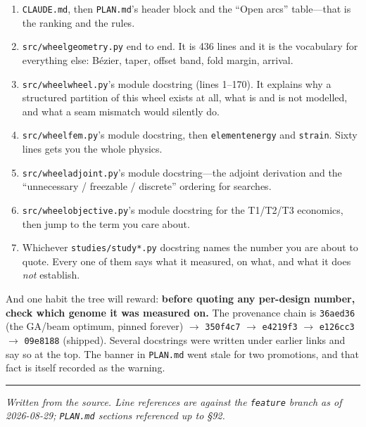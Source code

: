 \documentclass[11pt,a4paper]{article}
\DeclareRobustCommand{\code}[1]{%
  \texttt{\small\def\_{\textunderscore\discretionary{}{}{}}#1}}
\begin{document}
\begin{enumerate}
\item \code{CLAUDE.md}, then \code{PLAN.md}'s header block and the ``Open arcs''
  table---that is the ranking and the rules.
\item \code{src/wheel\_geometry.py} end to end. It is 436 lines and it is the vocabulary
  for everything else: B\'ezier, taper, offset band, fold margin, arrival.
\item \code{src/wheel\_wheel.py}'s module docstring (lines 1--170). It explains why a
  structured partition of this wheel exists at all, what is and is not modelled, and
  what a seam mismatch would silently do.
\item \code{src/wheel\_fem.py}'s module docstring, then \code{element\_energy} and
  \code{\_strain}. Sixty lines gets you the whole physics.
\item \code{src/wheel\_adjoint.py}'s module docstring---the adjoint derivation and the
  ``unnecessary / freezable / discrete'' ordering for searches.
\item \code{src/wheel\_objective.py}'s module docstring for the T1/T2/T3 economics, then
  jump to the term you care about.
\item Whichever \code{studies/study\_*.py} docstring names the number you are about to
  quote. Every one of them says what it measured, on what, and what it does \emph{not}
  establish.
\end{enumerate}

And one habit the tree will reward: \textbf{before quoting any per-design number, check
which genome it was measured on.} The provenance chain is \code{36aed36} (the GA/beam
optimum, pinned forever) $\to$ \code{350f4c7} $\to$ \code{e4219f3} $\to$ \code{e126cc3}
$\to$ \code{09e8188} (shipped). Several docstrings were written under earlier links and
say so at the top. The banner in \code{PLAN.md} went stale for two promotions, and that
fact is itself recorded as the warning.

\vfill
\begin{center}\rule{0.45\linewidth}{0.4pt}\end{center}
\begin{center}\small\itshape
Written from the source. Line references are against the \code{feature} branch as of
2026-08-29; \code{PLAN.md} sections referenced up to \S92.
\end{center}
\end{document}
